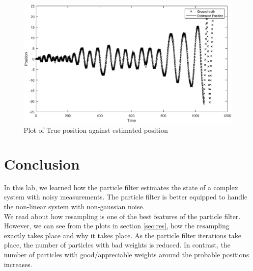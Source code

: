 \documentclass{article}
\begin{document}
\begin{figure}
\centering
\includegraphics[scale=0.6]{result.eps}
\caption{Plot of True position against estimated position}
\label{fig:2}
\end{figure}

\pagebreak
\clearpage
\section{Conclusion}\label{sec:conc}

In this lab, we learned how the particle filter estimates the state of a complex system with noisy measurements. The particle filter is better equipped to handle the non-linear system with non-gaussian noise.\\

We read about how resampling is one of the best features of the particle filter. However, we can see from the plots in section \ref{sec:res}, how the resampling exactly takes place and why it takes place. As the particle filter iterations take place, the number of particles with bad weights is reduced. In contrast, the number of particles with good/appreciable weights around the probable positions increases.
\end{document}
